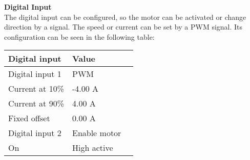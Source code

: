 \textbf{Digital Input}\\
The digital input can be configured, so the motor can be activated or change direction by a signal. The speed or current can be set by a PWM signal. Its configuration can be seen in the following table:
\begin{table}[H]
	\begin{tabular}{|l|l|p{4.3cm}|}
		\hline%
		\textbf{Digital input}       &  \textbf{Value}         \\
		\hline%
		Digital input 1                                & PWM           \\
		\hline%
		Current at 10\%							  & -4.00 A              \\
		\hline%
		Current at 90\%							  & 4.00 A              \\
		\hline%
		Fixed offset							  & 0.00 A              \\
		\hline%
		Digital input 2                                & Enable motor           \\
		\hline%
		On     &  High active       \\
		\hline%
	\end{tabular}
\end{table}

